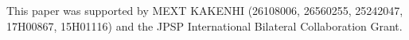 \documentclass[a4paper]{spie}  %
\begin{document}
This paper was supported by MEXT KAKENHI (26108006, 26560255, 25242047, 17H00867, 15H01116) and the JPSP International Bilateral Collaboration Grant.
\clearpage
\newpage


\end{document}
